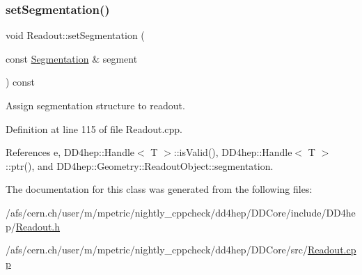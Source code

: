 \subsubsection{\texorpdfstring{set\+Segmentation()}{setSegmentation()}}
{\footnotesize\ttfamily void Readout\+::set\+Segmentation (\begin{DoxyParamCaption}\item[{const \hyperlink{class_d_d4hep_1_1_geometry_1_1_segmentation}{Segmentation} \&}]{segment }\end{DoxyParamCaption}) const}



Assign segmentation structure to readout. 



Definition at line 115 of file Readout.\+cpp.



References e, D\+D4hep\+::\+Handle$<$ T $>$\+::is\+Valid(), D\+D4hep\+::\+Handle$<$ T $>$\+::ptr(), and D\+D4hep\+::\+Geometry\+::\+Readout\+Object\+::segmentation.



The documentation for this class was generated from the following files\+:\begin{DoxyCompactItemize}
\item 
/afs/cern.\+ch/user/m/mpetric/nightly\+\_\+cppcheck/dd4hep/\+D\+D\+Core/include/\+D\+D4hep/\hyperlink{_readout_8h}{Readout.\+h}\item 
/afs/cern.\+ch/user/m/mpetric/nightly\+\_\+cppcheck/dd4hep/\+D\+D\+Core/src/\hyperlink{_readout_8cpp}{Readout.\+cpp}\end{DoxyCompactItemize}

